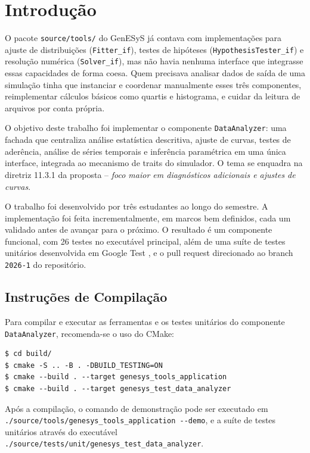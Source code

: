 \section{Introdução}

O pacote \texttt{source/tools/} do GenESyS já contava com implementações para ajuste de distribuições (\texttt{Fitter\_if}), testes de hipóteses (\texttt{HypothesisTester\_if}) e resolução numérica (\texttt{Solver\_if}), mas não havia nenhuma interface que integrasse essas capacidades de forma coesa. Quem precisava analisar dados de saída de uma simulação tinha que instanciar e coordenar manualmente esses três componentes, reimplementar cálculos básicos como quartis e histograma, e cuidar da leitura de arquivos por conta própria.

O objetivo deste trabalho foi implementar o componente \texttt{DataAnalyzer}: uma fachada que centraliza análise estatística descritiva, ajuste de curvas, testes de aderência, análise de séries temporais e inferência paramétrica em uma única interface, integrada ao mecanismo de traits do simulador. O tema se enquadra na diretriz 11.3.1 da proposta -- \textit{foco maior em diagnósticos adicionais e ajustes de curvas}.

O trabalho foi desenvolvido por três estudantes ao longo do semestre. A implementação foi feita incrementalmente, em marcos bem definidos, cada um validado antes de avançar para o próximo. O resultado é um componente funcional, com 26 testes no executável principal, além de uma suíte de testes unitários desenvolvida em Google Test \cite{gtest}, e o pull request direcionado ao branch \texttt{2026-1} do repositório.

\subsection{Instruções de Compilação}

Para compilar e executar as ferramentas e os testes unitários do componente \texttt{DataAnalyzer}, recomenda-se o uso do CMake:

\begin{verbatim}
$ cd build/
$ cmake -S .. -B . -DBUILD_TESTING=ON
$ cmake --build . --target genesys_tools_application
$ cmake --build . --target genesys_test_data_analyzer
\end{verbatim}

Após a compilação, o comando de demonstração pode ser executado em \texttt{./source/tools/genesys\_tools\_application -{}-demo}, e a suíte de testes unitários através do executável \texttt{./source/tests/unit/genesys\_test\_data\_analyzer}.
